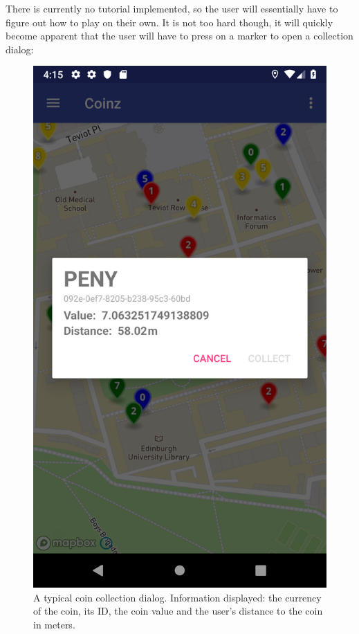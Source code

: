 \documentclass[11pt,a4paper,notitlepage]{article}
\begin{document}
    There is currently no tutorial implemented, so the user will essentially have to figure out how to play on their own. It is not too hard though, it will quickly become apparent that the user will have to press on a marker to open a collection dialog:

\begin{figure}[H]
    \centering
    \includegraphics[scale=0.25]{screenshots/map/coin-collect-dialog-too-far.png}
    \caption{A typical coin collection dialog. Information displayed: the currency of the coin, its ID, the coin value and the user's distance to the coin in meters.}
\end{figure}
\end{document}
